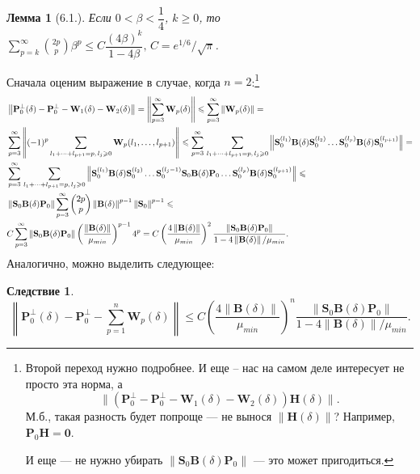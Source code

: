 \documentclass[fleqn]{article}
\newcommand\norm[1]{\left\|#1\right\|}
\renewcommand\b[1]{\mathbf{#1}}
\newtheorem{corollary}{Следствие}
\newtheorem{lemma}{Лемма}
\begin{document}
	\begin{lemma}[6.1.] \rm Если $0<\beta<\dfrac{1}{4}$, $k \geqslant 0$, то
	$\sum^\infty_{p=k}{2p \choose p}\beta^p \leqslant C\dfrac{(4\beta)^k}{1-4\beta},\,C = e^{1/6}/\sqrt{\pi}$.
	\end{lemma}%
	Сначала оценим выражение в случае, когда $n=2$:\footnote{Второй переход нужно подробнее. И еще -- нас на самом деле интересует не просто эта норма, а
$$
\|\left({\b{P}_0^\bot - \b{P}_0^\bot - \b{W}_1(\delta) - \b{W}_2(\delta)}\right) \mathbf{H}(\delta)\|.
$$
М.б., такая разность будет попроще --- не вынося $\|\mathbf{H}(\delta)\|$? Например, $\mathbf{P}_0 \mathbf{H}=\mathbf{0}$.

И еще --- не нужно убирать $\norm{\b{S}_0\b{B}(\delta)\b{P}_0}$ --- это может пригодиться.
}
	\begin{align}\notag
		&\norm{\b{P}_0^\bot(\delta) - \b{P}_0^\bot - \b{W}_1(\delta) - \b{W}_2(\delta)} = \norm{\sum^\infty_{p=3}\b{W}_p(\delta)}\leqslant\sum_{p=3}^\infty\norm{\mathbf{W}_p(\delta)}=
		\\
		&\sum_{p=3}^\infty\norm{(-1)^p\sum\limits_{l_1+\dots+l_{p+1}=p,\,l_j\geqslant0}\mathbf{W}_p(l_1,\dots,l_{p+1})}\leqslant\sum_{p=3}^\infty\,\sum\limits_{l_1+\dots+l_{p+1}=p,\,l_j\geqslant0}\norm{\mathbf{S}_0^{(l_1)}\mathbf{B}(\delta)\mathbf{S}_0^{(l_2)}\dots\mathbf{S}_0^{(l_p)}\mathbf{B}(\delta)\mathbf{S}_0^{(l_{p+1})}}= \notag
		\\
		&\sum_{p=3}^\infty\,\sum\limits_{l_1+\dots+l_{p+1}=p,\,l_j\geqslant0}\norm{\mathbf{S}_0^{(l_1)}\mathbf{B}(\delta)\mathbf{S}_0^{(l_2)}\dots\mathbf{S}_0^{(l_j-1)}\mathbf{S}_0\mathbf{B}(\delta)\mathbf{P}_0\dots\mathbf{S}_0^{(l_p)}\mathbf{B}(\delta)\mathbf{S}_0^{(l_{p+1})}}\leqslant\notag
		\\
		&\norm{\b{S}_0\b{B}(\delta)\b{P}_0}\sum_{p=3}^\infty\begin{pmatrix}2p\\p\end{pmatrix}\norm{\b{B}(\delta)}^{p-1}\norm{\b{S}_0}^{p-1}\leqslant\notag
		\\
		&C\sum^\infty_{p=3}\norm{\b{S}_0\b{B}(\delta)\b{P}_0}\left(\dfrac{\norm{\b{B}(\delta)}}{\mu_{min}}\right)^{p-1}4^p=C\left(\dfrac{4\norm{\b{B}(\delta)}}{\mu_{min}}\right)^2\dfrac{\norm{\b{S}_0\b{B}(\delta)\b{P}_0}}{1-4\norm{\b{B}(\delta)}/\mu_{min}}. \label{eq:m_1}
	\end{align}
	Аналогично, можно выделить следующее:
	\begin{corollary}%
	\begin{equation}\label{eq:m_2}
		\norm{\b{P}_0^\bot(\delta) - \b{P}_0^\bot - \sum\limits^n_{p=1}\b{W}_p(\delta)} \leqslant C\left(\dfrac{4\norm{\b{B}(\delta)}}{\mu_{min}}\right)^n\dfrac{\norm{\b{S}_0\b{B}(\delta)\b{P}_0}}{1-4\norm{\b{B}(\delta)}/\mu_{min}}.
	\end{equation}
	\end{corollary}
\end{document}
